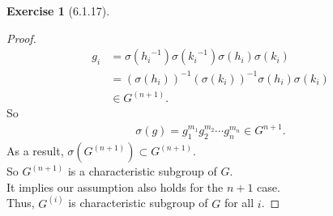 \documentclass{amsart}
\theoremstyle{plain}
\theoremstyle{definition}
\newtheorem{exer}[lem]{Exercise}
\begin{document}
\begin{exer}[6.1.17]
\begin{proof}
  	\begin{align*}
  		g_i &= \sigma({h_i}^{-1})\sigma({k_i}^{-1}) \sigma(h_i) \sigma(k_i) \\
  			&= \left(\sigma(h_i)\right)^{-1}\left(\sigma(k_i)\right)^{-1}\sigma(h_i)\sigma(k_i) \\
  	  		&\in G^{(n+1)}.
    \end{align*}
    So
    \begin{align*}
		\sigma(g) = g_1^{m_1}g_2^{m_2}\cdots g_n^{m_n} \in G^{n+1}. 
    \end{align*}
    As a result, $\sigma(G^{(n+1)}) \subset  G^{(n+1)}$.\\
    So $G^{(n+1)}$ is a characteristic subgroup of $G$.\\
	It implies our assumption also holds for the $n+1$ case.\\
  	Thus, $G^{(i)}$ is characteristic subgroup of $G$ for all $i$.
  \end{proof}
\end{exer}
\end{document}
